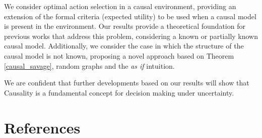 \documentclass[review]{elsarticle}
\begin{document}
We consider optimal action selection in a causal environment, providing an extension of the formal criteria (expected utility) to be used when a causal model is present in the environment. Our results provide a theoretical foundation for previous works that address this problem, considering a known or partially known causal model. Additionally, we consider the case in which the structure of the causal model is not known, proposing a novel approach based on Theorem \ref{causal_savage}, random graphs and the \textit{as if} intuition.

We are confident that further developments based on our results will show that Causality is a fundamental concept for decision making under uncertainty.


\section*{References}

\end{document}
